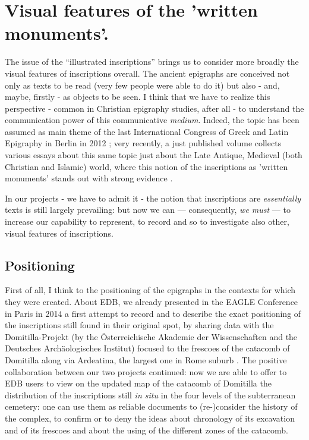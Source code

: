 \documentclass[amsthm,ebook]{saparticle}
\begin{document}
\section{Visual features of the 'written monuments'.}


\noindent The issue of the ``illustrated inscriptions'' brings us to consider more broadly the visual
features of inscriptions overall. The ancient epigraphs are conceived not only as texts to be read (very few people
were able to do it) but also - and, maybe, firstly - as objects to be seen. I think that we have to realize this
perspective - common in Christian epigraphy studies, after all - to understand the communication power of this
communicative \emph{medium}. Indeed, the topic has been assumed as main theme of the last International Congress of Greek and
Latin Epigraphy in Berlin in 2012 \citep{eck_vol_2014}; very recently, a just published volume collects various essays
about this same topic just about the Late Antique, Medieval (both Christian and Islamic) world, where this notion of
the inscriptions as 'written monuments' stands out with strong evidence \citep[see][]{eastmond_viewing_2015}. 

In our projects - we have to admit it - the notion that inscriptions are \emph{essentially} texts is still largely
prevailing: but now we can --- consequently, \emph{we must} --- to increase our capability to represent, to record and so to
investigate also other, visual features of inscriptions. 




\subsection{Positioning}


\noindent First of all, I think to the positioning of the epigraphs in the contexts for which they were created. About EDB, we
already presented in the EAGLE Conference in Paris in 2014 a first attempt to record and to describe the exact
positioning of the inscriptions still found in their original spot, by sharing data with the Domitilla-Projekt (by the
Österreichi\-sche Akademie der Wissenschaften and the Deutsches Archäologisches Institut) focused to the frescoes of the
catacomb of Domitilla along via Ardeatina, the largest one in Rome suburb \citep{zimmermann_epigraphy_2014}. The positive
collaboration between our two projects continued: now we are able to offer to EDB users to view on the updated map of
the catacomb of Domitilla the distribution of the inscriptions still \emph{in situ} in the four levels of the subterranean
cemetery: one can use them as reliable documents to (re-)consider the history of the complex, to confirm or to deny the
ideas about chronology of its excavation and of its frescoes and about the using of the different zones of the
catacomb.
\end{document}
